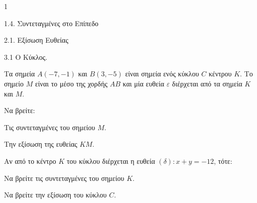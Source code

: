 \begin{ylh}{1}
    \item 1.4. Συντεταγμένες στο Επίπεδο
    \item 2.1. Εξίσωση Ευθείας
    \item 3.1 Ο Κύκλος.
\end{ylh}
Τα σημεία $A(-7, -1)$ και $B(3, -5)$ είναι σημεία ενός κύκλου $C$ κέντρου $K$. Το σημείο $M$ είναι το μέσο της χορδής $AB$ και μία ευθεία $\varepsilon$ διέρχεται από τα σημεία $K$ και $M$.
\begin{alist}
    \item Να βρείτε:
    \begin{rlist}
        \item Τις συντεταγμένες του σημείου $M$. 
        \item Την εξίσωση της ευθείας $KM$. 
    \end{rlist}
    \item Αν από το κέντρο $K$ του κύκλου διέρχεται η ευθεία $(\delta): x+y = -12$, τότε:
    \begin{rlist}
        \item Να βρείτε τις συντεταγμένες του σημείου $K$. 
        \item Να βρείτε την εξίσωση του κύκλου $C$. 
    \end{rlist}
\end{alist}